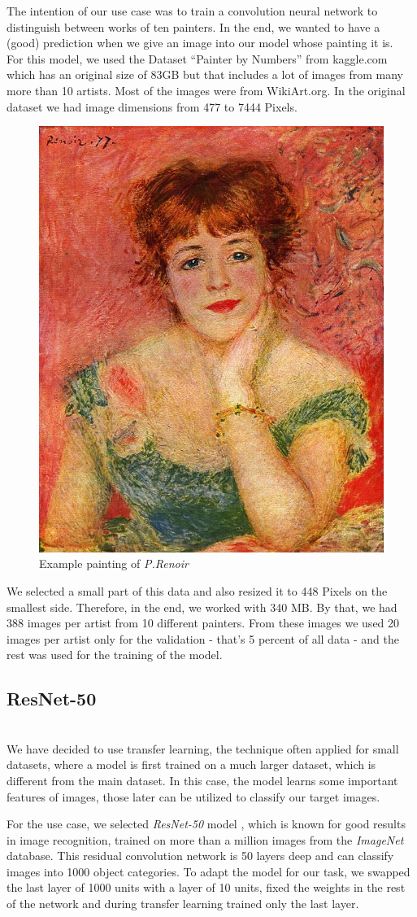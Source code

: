 \documentclass[
	12pt, %
]{fphw}
\begin{document}
The intention of our use case was to train a convolution neural network to distinguish between works of ten
painters. In the end, we wanted to have a (good) prediction when we give an image into our model whose painting it is.\\

For this model, we used the Dataset ``Painter by Numbers'' from kaggle.com \cite{kaggle} which has an original size of 83GB  but that includes a lot of images from many more than 10 artists. Most of the images were from WikiArt.org. In the original dataset we had image dimensions from 477 to 7444 Pixels.\\

\begin{figure}[H]
	\center\includegraphics[width=0.2 \textwidth]{Renoir.jpg}
	\caption{Example painting of \textit{P.Renoir}}
\end{figure}

We selected a small part of this data and also resized it to 448 Pixels on the smallest side. Therefore, in the end, we worked with 340 MB. By that, we had 388 images per artist from 10 different painters. From these images we used 20 images per artist only for the validation - that's 5 percent of all data - and the rest was used for the training of the model.\\

\subsection*{ResNet-50}
\ \\  

We have decided to use transfer learning, the technique often applied for small datasets, where a model is first trained on a much larger dataset, which is different from the main dataset. In this case, the model learns some important features of images, those later can be utilized to classify our target images.  

For the use case, we selected \textit{ResNet-50} model \cite{resnet}, which is known for good results in image recognition, trained on more than a million images from the \textit{ImageNet} database. This residual convolution network is 50 layers deep and can classify images into 1000 object categories. To adapt the model for our task, we swapped the last layer of 1000 units with a layer of 10 units, fixed the weights in the rest of the network and during transfer learning trained only the last layer.  \\
\end{document}
